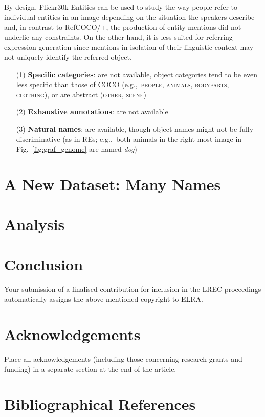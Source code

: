 \documentclass[10pt, a4paper]{article}
\newcommand{\refexp}[1]{\textsl{#1}}
\newcommand{\cat}[1]{\textsc{#1}}
\newcommand{\refcoco}{RefCOCO\xspace}
\newcommand{\flickr}{Flickr30k Entities\xspace}
\begin{document}
By design, \flickr can be used to study the way people refer to individual entities in an image depending on the situation the speakers describe and,  
in contrast to \refcoco/+, the production of entity mentions did not underlie any constraints. 
On the other hand, it is less suited for referring expression generation since mentions in isolation of their linguistic context may not uniquely identify the referred object. 

\begin{itemize}
     		\item[(1)] \textbf{Specific categories}: are not available, object categories tend to be even less specific than those of COCO (e.g.,~\cat{people, animals, bodyparts, clothing}), or are abstract (\cat{other, scene})
		\item[(2)] \textbf{Exhaustive annotations}: are not available
		   \item[(3)] \textbf{Natural names}: are available, though object names might not be fully discriminative (as in REs; e.g.,~both animals in the right-most image in Fig.~\ref{fig:graf_genome} are named \refexp{dog})

\end{itemize}

\section{A New Dataset: Many Names}
	\label{sec:data}
	
	
	\section{Analysis}
	\label{sec:analysis}
	


\section{Conclusion}

Your submission of a finalised contribution for inclusion in the LREC
proceedings automatically assigns the above-mentioned copyright to ELRA.


\section{Acknowledgements}

Place all acknowledgements (including those concerning research grants and
funding) in a separate section at the end of the article.

\section{Bibliographical References}
\label{main:ref}





\end{document}
